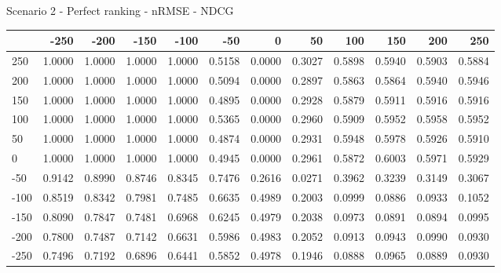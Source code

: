 Scenario 2 - Perfect ranking - nRMSE - NDCG
\begin{tabular}{lrrrrrrrrrrr}
\toprule
{} &   -250 &   -200 &   -150 &   -100 &   -50  &    0   &    50  &    100 &    150 &    200 &    250 \\
\midrule
 250 & 1.0000 & 1.0000 & 1.0000 & 1.0000 & 0.5158 & 0.0000 & 0.3027 & 0.5898 & 0.5940 & 0.5903 & 0.5884 \\
 200 & 1.0000 & 1.0000 & 1.0000 & 1.0000 & 0.5094 & 0.0000 & 0.2897 & 0.5863 & 0.5864 & 0.5940 & 0.5946 \\
 150 & 1.0000 & 1.0000 & 1.0000 & 1.0000 & 0.4895 & 0.0000 & 0.2928 & 0.5879 & 0.5911 & 0.5916 & 0.5916 \\
 100 & 1.0000 & 1.0000 & 1.0000 & 1.0000 & 0.5365 & 0.0000 & 0.2960 & 0.5909 & 0.5952 & 0.5958 & 0.5952 \\
 50  & 1.0000 & 1.0000 & 1.0000 & 1.0000 & 0.4874 & 0.0000 & 0.2931 & 0.5948 & 0.5978 & 0.5926 & 0.5910 \\
 0   & 1.0000 & 1.0000 & 1.0000 & 1.0000 & 0.4945 & 0.0000 & 0.2961 & 0.5872 & 0.6003 & 0.5971 & 0.5929 \\
-50  & 0.9142 & 0.8990 & 0.8746 & 0.8345 & 0.7476 & 0.2616 & 0.0271 & 0.3962 & 0.3239 & 0.3149 & 0.3067 \\
-100 & 0.8519 & 0.8342 & 0.7981 & 0.7485 & 0.6635 & 0.4989 & 0.2003 & 0.0999 & 0.0886 & 0.0933 & 0.1052 \\
-150 & 0.8090 & 0.7847 & 0.7481 & 0.6968 & 0.6245 & 0.4979 & 0.2038 & 0.0973 & 0.0891 & 0.0894 & 0.0995 \\
-200 & 0.7800 & 0.7487 & 0.7142 & 0.6631 & 0.5986 & 0.4983 & 0.2052 & 0.0913 & 0.0943 & 0.0990 & 0.0930 \\
-250 & 0.7496 & 0.7192 & 0.6896 & 0.6441 & 0.5852 & 0.4978 & 0.1946 & 0.0888 & 0.0965 & 0.0889 & 0.0930 \\
\bottomrule
\end{tabular}

